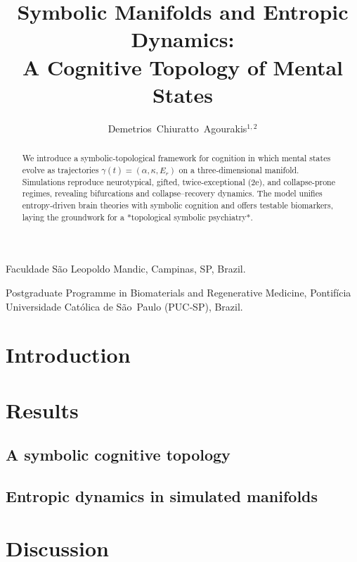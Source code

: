 \documentclass{nature}             %
\title{Symbolic Manifolds and Entropic Dynamics: \\ A Cognitive Topology of Mental States}
\author{Demetrios Chiuratto Agourakis$^{1,2}$}
\begin{document}
\maketitle

\begin{affiliations}
 \item Faculdade São Leopoldo Mandic, Campinas, SP, Brazil.
 \item Postgraduate Programme in Biomaterials and Regenerative Medicine, Pontifícia Universidade Católica de São Paulo (PUC‑SP), Brazil.
\end{affiliations}

\begin{abstract}
We introduce a symbolic-topological framework for cognition in which mental states evolve as trajectories $\gamma(t) = (\alpha, \kappa, E_r)$ on a three-dimensional manifold. Simulations reproduce neurotypical, gifted, twice-exceptional (2e), and collapse-prone regimes, revealing bifurcations and collapse–recovery dynamics. The model unifies entropy-driven brain theories with symbolic cognition and offers testable biomarkers, laying the groundwork for a *topological symbolic psychiatry*.
\end{abstract}
\section*{Introduction}


\section*{Results}
\subsection*{A symbolic cognitive topology}


\subsection*{Entropic dynamics in simulated manifolds}


\section*{Discussion}

\end{document}
